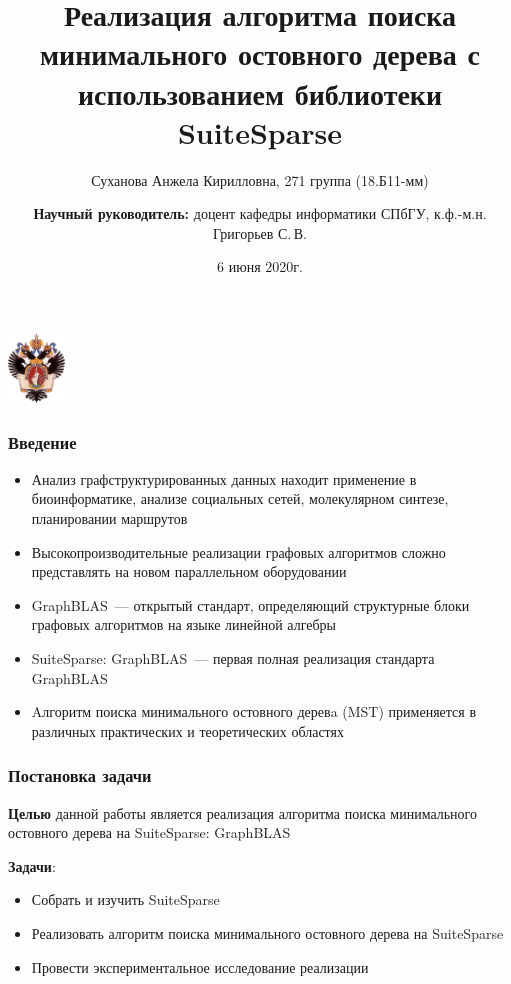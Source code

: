 \documentclass{beamer}
\title[]{\large Реализация алгоритма поиска минимального остовного дерева с использованием библиотеки SuiteSparse}
\subtitle[]{}
\institute[СПбГУ]{
Санкт-Петербургский государственный университет \\
Кафедра системного программирования }
\author[Суханова Анжела]{Суханова Анжела Кирилловна, 271 группа (18.Б11-мм) \\
  \and  
     {\bfseries Научный руководитель:} доцент кафедры информатики СПбГУ, к.ф.-м.н. Григорьев С.\,В.}
\date{6 июня 2020г.}
\begin{document}
{
\begin{frame}
  \begin{center}
  {\includegraphics[width=1.5cm]{pictures/SPbGU_Logo.png}}
  \end{center}
  \titlepage
\end{frame}
}

\begin{frame}[fragile]
  \transwipe[direction=90]
  \frametitle{Введение}
  \begin{itemize}
    \item Анализ графструктурированных данных находит применение в биоинформатике, анализе социальных сетей, молекулярном синтезе, планировании маршрутов
    \item Высокопроизводительные реализации графовых алгоритмов сложно представлять на новом параллельном оборудовании
    \item GraphBLAS~--- открытый стандарт, определяющий структурные блоки графовых алгоритмов на языке линейной алгебры
    \item SuiteSparse: GraphBLAS~--- первая полная реализация стандарта GraphBLAS
    \item Aлгоритм поиска минимального остовного деревa (MST) применяется в различных практических и теоретических областях
  \end{itemize}
\end{frame}
            

\begin{frame}
  \transwipe[direction=90]
  \frametitle{Постановка задачи}
  \textbf{Целью} данной работы является реализация алгоритма поиска минимального остовного дерева 
на SuiteSparse: GraphBLAS

  \textbf{Задачи}:
  \begin{itemize}
    \item Собрать и изучить SuiteSparse
    \item Реализовать алгоритм поиска минимального остовного дерева на SuiteSparse
    \item Провести экспериментальное исследование реализации
  \end{itemize}
\end{frame}
\end{document}
